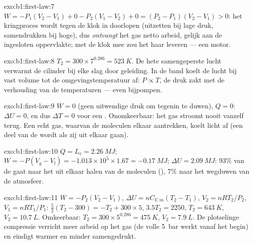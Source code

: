 \begin{solution}{exo:b1:first-law:7}
$W = -P_1(V_2 - V_1) + 0 - P_2(V_1 - V_2) + 0 = (P_2 - P_1)(V_2 - V_1) > 0$:
het kringproces wordt tegen de klok in doorlopen (uitzetten bij lage druk,
samendrukken bij hoge), dus \emph{ontvangt} het gas netto arbeid, gelijk aan de
ingesloten oppervlakte; met de klok mee zou het haar leveren --- een motor.
\end{solution}

\begin{solution}{exo:b1:first-law:8}
$T_2 = 300 \times 7^{0.286} = \qty{523}{K}$. De hete samengeperste lucht verwarmt de
cilinder bij elke slag door geleiding. In de band koelt de lucht bij vast
volume tot de omgevingstemperatuur af: $P \propto T$, de druk zakt met de verhouding
van de temperaturen --- even bijpompen.
\end{solution}

\begin{solution}{exo:b1:first-law:9}
$W = 0$ (geen uitwendige druk om tegenin te duwen), $Q = 0$: $\Delta U = 0$,
en dus $\Delta T = 0$ voor een . Onomkeerbaar: het gas stroomt nooit
vanzelf terug. Een echt gas, waarvan de moleculen elkaar aantrekken, koelt licht af
(een deel van de  wordt  als zij uit elkaar gaan).
\end{solution}

\begin{solution}{exo:b1:first-law:10}
$Q = L_v = \qty{2.26}{MJ}$; $W = -P(V_g - V_l) = -1.013\times10^5 \times 1.67 =
\qty{-0.17}{MJ}$; $\Delta U = \qty{2.09}{MJ}$: $93\%$ van de  gaat naar het
uit elkaar halen van de moleculen (), $7\%$ naar het wegduwen van de
atmosfeer.
\end{solution}

\begin{solution}{exo:b1:first-law:11}
$W = -P_2(V_2 - V_1)$, $\Delta U = nC_{V,m}(T_2 - T_1)$, $V_2 = nRT_2/P_2$, $V_1
= nRT_1/P_1$: $\tfrac52(T_2 - 300) = -T_2 + 300 \times 5$, $3.5T_2 = 2250$,
$T_2 = \qty{643}{K}$, $V_2 = \qty{10.7}{L}$. Omkeerbaar: $T_2 = 300 \times
5^{0.286} = \qty{475}{K}$, $V_2 = \qty{7.9}{L}$. De plotselinge compressie verricht
meer arbeid op het gas (de volle \qty{5}{bar} werkt vanaf het begin) en eindigt
warmer en minder samengedrukt.
\end{solution}

